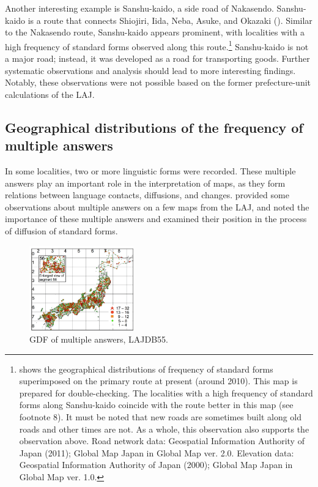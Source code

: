 \documentclass[output=paper]{LSP/langsci}
\begin{document}
Another interesting example is Sanshu-kaido, a side road of Nakasendo. Sanshu-kaido is a route that connects Shiojiri, Iida, Neba, Asuke, and Okazaki (). Similar to the Nakasendo route, Sanshu-kaido appears prominent, with localities with a high frequency of standard forms observed along this route.\footnote{ shows the geographical distributions of frequency of standard forms superimposed on the primary route at present (around 2010). This map is prepared for double-checking. The localities with a high frequency of standard forms along Sanshu-kaido coincide with the route better in this map (see footnote 8). It must be noted that new roads are sometimes built along old roads and other times are not. As a whole, this observation also supports the observation above. Road network data: Geospatial Information Authority of Japan (2011); Global Map Japan in Global Map ver. 2.0. Elevation data: Geospatial Information Authority of Japan (2000); Global Map Japan in Global Map ver. 1.0.} Sanshu-kaido is not a major road; instead, it was developed as a road for transporting goods. Further systematic observations and analysis should lead to more interesting findings. Notably, these observations were not possible based on the former prefecture-unit calculations of the LAJ.

\subsection{Geographical distributions of the frequency of multiple answers}
In some localities, two or more linguistic forms were recorded. These multiple answers play an important role in the interpretation of maps, as they form relations between language contacts, diffusions, and changes. \citet{inagaki_hogen_1980} provided some observations about multiple answers on a few maps from the LAJ, and \citet{inoue_heiyo_2004} noted the importance of these multiple answers and examined their position in the process of diffusion of standard forms. 

\begin{figure}
\includegraphics[width=0.4\textwidth]{illustrations/kuma_fig14}
\caption{GDF of multiple answers, LAJDB55.}          
\label{fig:14}
\end{figure}
\end{document}
